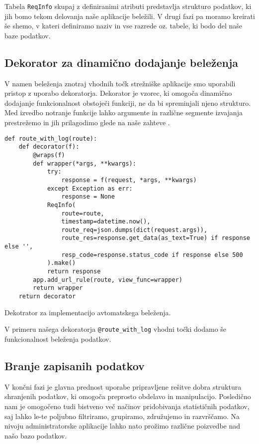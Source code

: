 \documentclass[a4paper,12pt,openright]{book}
\begin{document}
    \noindent
    Tabela {\tt ReqInfo} skupaj z definiranimi atributi predstavlja strukturo podatkov, ki jih bomo tekom delovanja naše aplikacije beležili. V drugi fazi pa moramo kreirati še shemo, v kateri definiramo naziv in vse razrede oz. tabele, ki bodo del naše baze podatkov.

    \subsection{Dekorator za dinamično dodajanje beleženja}

    V namen beleženja znotraj vhodnih točk strežniške aplikacije smo uporabili pristop z uporabo dekoratorja.
    Dekorator je vzorec,  ki omogoča dinamično dodajanje funkcionalnost obstoječi funkciji, ne da bi spreminjali njeno strukturo. Med izvedbo notranje funkcije lahko argumente in različne segmente izvajanja prestrežemo in jih prilagodimo glede na naše zahteve \cite{mu2011design}.

\begin{code}
\begin{verbatim}
def route_with_log(route):
    def decorator(f):
        @wraps(f)
        def wrapper(*args, **kwargs):
            try:
                response = f(request, *args, **kwargs)
            except Exception as err:
                response = None
            ReqInfo(
                route=route,
                timestamp=datetime.now(),
                route_req=json.dumps(dict(request.args)),
                route_res=response.get_data(as_text=True) if response else '',
                resp_code=response.status_code if response else 500
            ).make()
            return response
        app.add_url_rule(route, view_func=wrapper)
        return wrapper
    return decorator
\end{verbatim}
\caption{Dekotrator za implementacijo avtomatskega beleženja.}
\label{log_decorator}
\end{code}

    \noindent
    V primeru našega dekoratorja {\tt @route\_with\_log} vhodni točki dodamo še funkcionalnost beleženja podatkov.

    \subsection{Branje zapisanih podatkov}

    V končni fazi je glavna prednost uporabe pripravljene rešitve dobra struktura shranjenih podatkov, ki omogoča preprosto obdelavo in manipulacijo. Posledično nam je omogočeno tudi bistveno več načinov pridobivanja statističnih podatkov, saj lahko le-te poljubno filtriramo, grupiramo, združujemo in razvrščamo. Na nivoju administratorske aplikacije lahko nato prožimo različne poizvedbe nad našo bazo podatkov.
\end{document}
